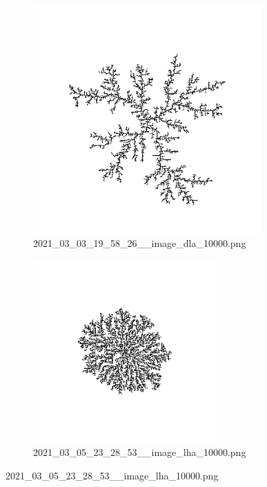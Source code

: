 \documentclass[12pt,a4paper]{scrartcl}
\newcommand{\1}{\mathbbm{1}}
\theoremstyle{definition}
\numberwithin{equation}{section}
\begin{document}
\begin{figure}[h!]
	\centering
	\begin{subfigure}[b]{.49\textwidth}
		\centerline{\includegraphics[height=8.75cm]{images/ia/2021_03_03_19_58_26__image_dla_10000.png}}
		\captionsetup{labelformat=empty}
		\caption{2021\_03\_03\_19\_58\_26\_\_image\_dla\_10000.png}
	\end{subfigure}
	\begin{subfigure}[b]{.49\textwidth}
		\centerline{\includegraphics[height=7cm]{images/ia/2021_03_05_23_28_53__image_lha_10000.png}}
		\captionsetup{labelformat=empty}
		\caption{2021\_03\_05\_23\_28\_53\_\_image\_lha\_10000.png}
	\end{subfigure}
\end{figure}
\end{document}
